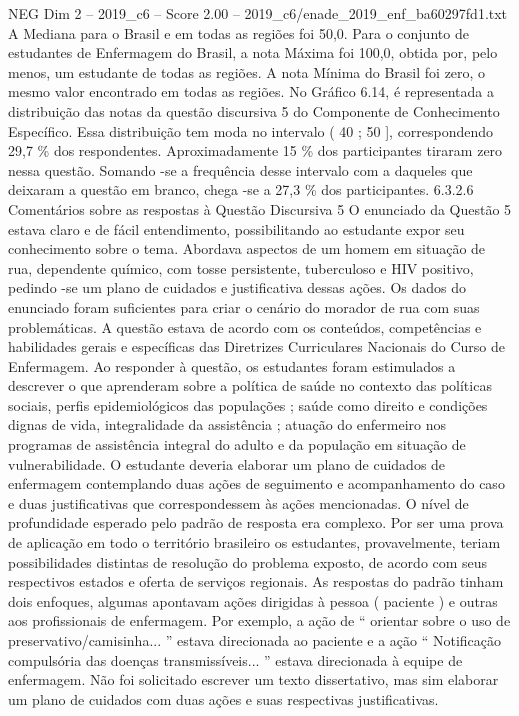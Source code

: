 \begin{textsample}{NEG Dim 2 – 2019\_c6 – Score 2.00 – 2019\_c6/enade\_2019\_enf\_ba60297fd1.txt}
A Mediana para o Brasil e em todas as regiões foi 50,0.
Para o conjunto de estudantes de Enfermagem do Brasil, a nota Máxima foi 100,0, obtida por, pelo menos, um estudante de todas as regiões.
A nota Mínima do Brasil foi zero, o mesmo valor encontrado em todas as regiões.
No Gráfico 6.14, é representada a distribuição das notas da questão discursiva 5 do Componente de Conhecimento Específico.
Essa distribuição tem moda no intervalo ( 40 ; 50 ], correspondendo 29,7 \% dos respondentes.
Aproximadamente 15 \% dos participantes tiraram zero nessa questão.
Somando -se a frequência desse intervalo com a daqueles que deixaram a questão em branco, chega -se a 27,3 \% dos participantes. 6.3.2.6 Comentários sobre as respostas à Questão Discursiva 5 O enunciado da Questão 5 estava claro e de fácil entendimento, possibilitando ao estudante expor seu conhecimento sobre o tema.
Abordava aspectos de um homem em situação de rua, dependente químico, com tosse persistente, tuberculoso e HIV positivo, pedindo -se um plano de cuidados e justificativa dessas ações.
Os dados do enunciado foram suficientes para criar o cenário do morador de rua com suas problemáticas.
A questão estava de acordo com os conteúdos, competências e habilidades gerais e específicas das Diretrizes Curriculares Nacionais do Curso de Enfermagem.
Ao responder à questão, os estudantes foram estimulados a descrever o que aprenderam sobre a política de saúde no contexto das políticas sociais, perfis epidemiológicos das populações ; saúde como direito e condições dignas de vida, integralidade da assistência ; atuação do enfermeiro nos programas de assistência integral do adulto e da população em situação de vulnerabilidade.
O estudante deveria elaborar um plano de cuidados de enfermagem contemplando duas ações de seguimento e acompanhamento do caso e duas justificativas que correspondessem às ações mencionadas.
O nível de profundidade esperado pelo padrão de resposta era complexo.
Por ser uma prova de aplicação em todo o território brasileiro os estudantes, provavelmente, teriam possibilidades distintas de resolução do problema exposto, de acordo com seus respectivos estados e oferta de serviços regionais.
As respostas do padrão tinham dois enfoques, algumas apontavam ações dirigidas à pessoa ( paciente ) e outras aos profissionais de enfermagem.
Por exemplo, a ação de “ orientar sobre o uso de preservativo/camisinha... ” estava direcionada ao paciente e a ação “ Notificação compulsória das doenças transmissíveis... ” estava direcionada à equipe de enfermagem.
Não foi solicitado escrever um texto dissertativo, mas sim elaborar um plano de cuidados com duas ações e suas respectivas justificativas.

\end{textsample}
